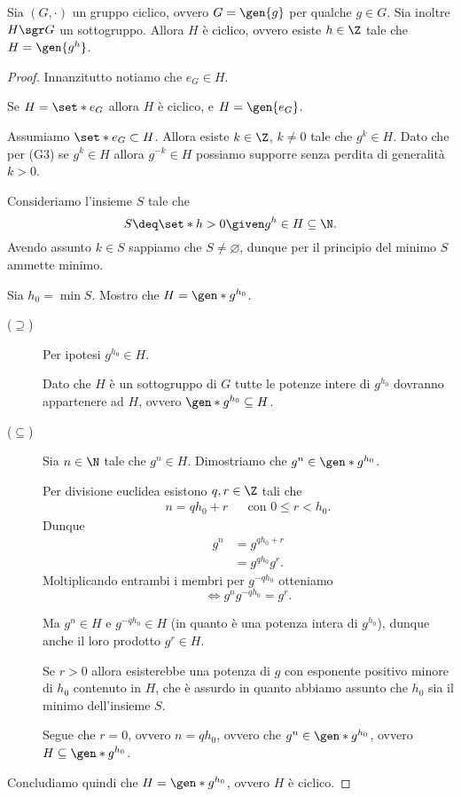 \begin{theorem}
     \label{th:sottogr_ciclico}
    Sia $(G, \cdot)$ un gruppo ciclico, ovvero $G = \gen{g}$ per qualche $g \in G$. Sia inoltre $H \sgr G$ un sottogruppo.
    Allora $H$ è ciclico, ovvero esiste $h \in \Z$ tale che $H = \gen{g^h}$.
\end{theorem}
\begin{proof}
    Innanzitutto notiamo che $e_G \in H$. 
    
    Se $H = \set*{e_G}$ allora $H$ è ciclico, e $H = \gen{e_G}$.

    Assumiamo $\set* e_G \subset H$. Allora esiste $k \in \Z$, $k \neq 0$ tale che $g^k \in H$. 
    Dato che per (G3) se $g^k \in H$ allora $g^{-k} \in H$ possiamo supporre senza perdita di generalità $k > 0$.

    Consideriamo l'insieme $S$ tale che \[
        S \deq \set*{h > 0 \given g^h \in H} \subseteq \N.    
    \] Avendo assunto $k \in S$ sappiamo che $S \neq \varnothing$, dunque per il principio del minimo $S$ ammette minimo.

    Sia $h_0 = \min S$. Mostro che $H = \gen*{g^{h_0}}$.
    \begin{description}
        \item[($\supseteq$)] Per ipotesi $g^{h_0} \in H$. 
        
        Dato che $H$ è un sottogruppo di $G$ tutte le potenze intere di $g^{h_0}$ dovranno appartenere ad $H$, ovvero $\gen*{g^{h_0}} \subseteq H$.
        \item[($\subseteq$)] Sia $n \in \N$ tale che $g^n \in H$. Dimostriamo che $g^n \in \gen*{g^{h_0}}$.
        
        Per divisione euclidea esistono $q, r \in \Z$ tali che \begin{align*}
            n = qh_0 + r &&\text{con } 0 \leq r < h_0.
        \end{align*}
        Dunque \begin{align*}
            g^n &= g^{qh_0 + r}\\
                &= g^{qh_0}g^r.
        \end{align*}
        Moltiplicando entrambi i membri per $g^{-qh_0}$ otteniamo \[
            \iff g^ng^{-qh_0} = g^r.
        \]

        Ma $g^n \in H$ e $g^{-qh_0} \in H$ (in quanto è una potenza intera di $g^{h_0}$), dunque anche il loro prodotto $g^r \in H$.

        Se $r > 0$ allora esisterebbe una potenza di $g$ con esponente positivo minore di $h_0$ contenuto in $H$, che è assurdo in quanto abbiamo assunto che $h_0$ sia il minimo dell'insieme $S$.
        
        Segue che $r = 0$, ovvero $n = qh_0$, ovvero che $g^n \in \gen*{g^{h_0}}$, ovvero $H \subseteq \gen*{g^{h_0}}$.
    \end{description}

    Concludiamo quindi che $H = \gen*{g^{h_0}}$, ovvero $H$ è ciclico.
\end{proof}

